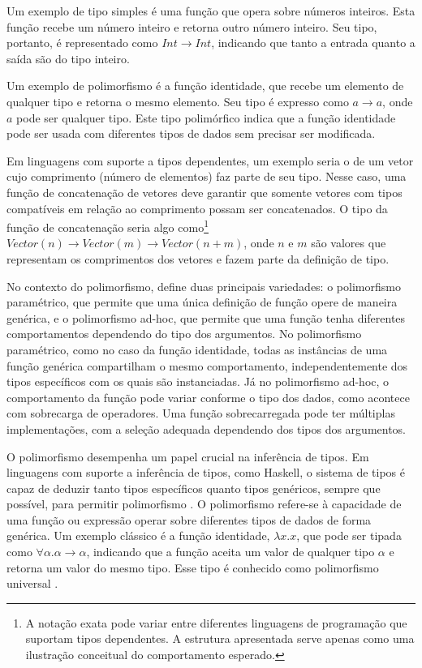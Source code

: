 Um exemplo de tipo simples é uma função que opera sobre números inteiros.
Esta função recebe um número inteiro e retorna outro número inteiro.
Seu tipo, portanto, é representado como $Int \rightarrow Int$, indicando que tanto a entrada quanto a saída são do tipo inteiro.

Um exemplo de polimorfismo é a função identidade, que recebe um elemento de qualquer tipo e retorna o mesmo elemento.
Seu tipo é expresso como $a \rightarrow a$, onde $a$ pode ser qualquer tipo.
Este tipo polimórfico indica que a função identidade pode ser usada com diferentes tipos de dados sem precisar ser modificada.

Em linguagens com suporte a tipos dependentes, um exemplo seria o de um vetor cujo comprimento (número de elementos) faz parte de seu tipo.
Nesse caso, uma função de concatenação de vetores deve garantir que somente vetores com tipos compatíveis em relação ao comprimento possam ser concatenados.
O tipo da função de concatenação seria algo como\footnote{A notação exata pode variar entre diferentes linguagens de programação que suportam tipos dependentes. A estrutura apresentada serve apenas como uma ilustração conceitual do comportamento esperado.} $Vector(n) \rightarrow Vector(m) \rightarrow Vector(n+m)$, onde $n$ e $m$ são valores que representam os comprimentos dos vetores e fazem parte da definição de tipo.

No contexto do polimorfismo,  define duas principais variedades: o polimorfismo paramétrico, que permite que uma única definição de função opere de maneira genérica, e o polimorfismo ad-hoc, que permite que uma função tenha diferentes comportamentos dependendo do tipo dos argumentos.
No polimorfismo paramétrico, como no caso da função identidade, todas as instâncias de uma função genérica compartilham o mesmo comportamento, independentemente dos tipos específicos com os quais são instanciadas.
Já no polimorfismo ad-hoc, o comportamento da função pode variar conforme o tipo dos dados, como acontece com sobrecarga de operadores. Uma função sobrecarregada pode ter múltiplas implementações, com a seleção adequada dependendo dos tipos dos argumentos.

O polimorfismo desempenha um papel crucial na inferência de tipos.
Em linguagens com suporte a inferência de tipos, como Haskell, o sistema de tipos é capaz de deduzir tanto tipos específicos quanto tipos genéricos, sempre que possível, para permitir polimorfismo \cite{PIERCE2002}.
O polimorfismo refere-se à capacidade de uma função ou expressão operar sobre diferentes tipos de dados de forma genérica.
Um exemplo clássico é a função identidade, $\lambda x.x$, que pode ser tipada como $\forall \alpha. \alpha \to \alpha$, indicando que a função aceita um valor de qualquer tipo $\alpha$ e retorna um valor do mesmo tipo.
Esse tipo é conhecido como polimorfismo universal \cite{PIERCE2002}.

